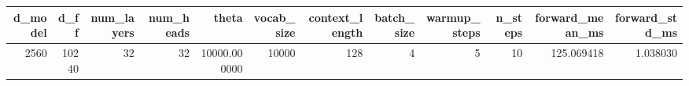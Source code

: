 \begin{tabular}{rrrrrrrrrrrr}
\toprule
d_model & d_ff & num_layers & num_heads & theta & vocab_size & context_length & batch_size & warmup_steps & n_steps & forward_mean_ms & forward_std_ms \\
\midrule
2560 & 10240 & 32 & 32 & 10000.000000 & 10000 & 128 & 4 & 5 & 10 & 125.069418 & 1.038030 \\
\bottomrule
\end{tabular}
